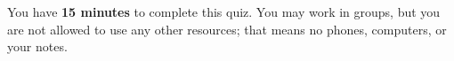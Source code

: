 \documentclass[12pt]{article}
\theoremstyle{plain}
\theoremstyle{definition}
\theoremstyle{remark}
\begin{document}
\author{TA: \href{mailto:\authoremail}{\documentauthor}}
\title{\documenttitle}
\date{\today}
\maketitle

You have \textbf{15 minutes} to complete this quiz. You may work in groups,
but you are not allowed to use any other resources; that means no phones,
computers, or your notes.
\\\\

% 
\end{document}
